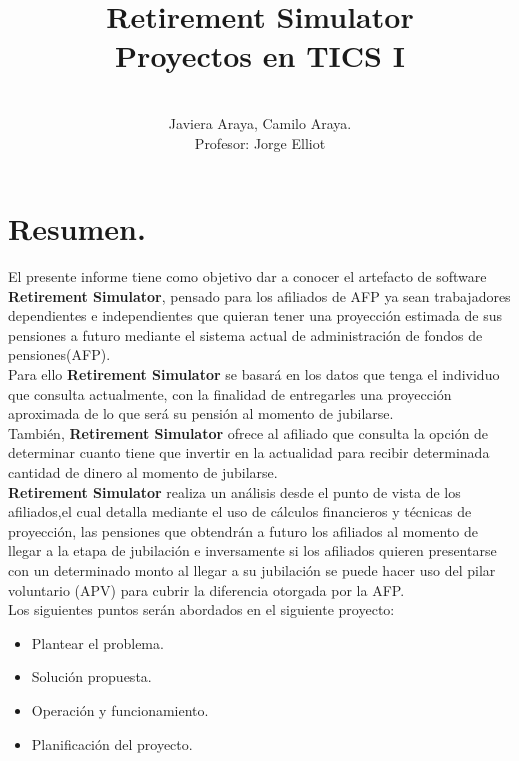 \documentclass{udpreport}
\title{Retirement Simulator\\
Proyectos en TICS I}
\author{\\[2cm]Javiera Araya, Camilo Araya. \\[1cm]Profesor: Jorge Elliot}
\begin{document}
\maketitle
\tableofcontents

\chapter{Resumen.}
El presente informe tiene como objetivo dar a conocer el artefacto de software \textbf{Retirement Simulator}, pensado para los afiliados de AFP ya sean trabajadores dependientes e independientes que quieran tener una proyección estimada de sus pensiones a futuro mediante el sistema actual de administración de fondos de pensiones(AFP). \\Para ello \textbf{Retirement Simulator} se basará en los datos que tenga el individuo que consulta actualmente, con la finalidad de entregarles una proyección aproximada de lo que será su pensión al momento de jubilarse. \\
También, \textbf{Retirement Simulator} ofrece al afiliado que consulta la opción de determinar cuanto tiene que invertir en la actualidad para recibir determinada cantidad de dinero al momento de jubilarse.
\\[1cm]
\textbf{Retirement Simulator} realiza un análisis desde el punto de vista de los afiliados,el cual detalla mediante el uso de cálculos financieros y técnicas de proyección, las pensiones que obtendrán a futuro los afiliados al momento de llegar a la etapa de jubilación e inversamente si los afiliados quieren presentarse con un determinado monto al llegar a su jubilación se puede hacer uso del pilar voluntario (APV) para cubrir la diferencia otorgada por la AFP.
\\
Los siguientes puntos serán abordados en el siguiente proyecto:
\begin{itemize}
    \item Plantear el problema.
    \item Solución propuesta.
    \item Operación y funcionamiento.
    \item Planificación del proyecto.
\end{itemize}
\end{document}
